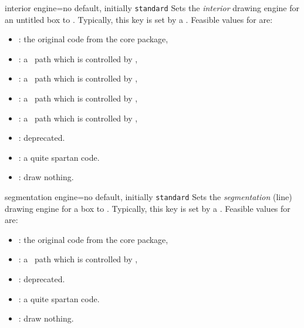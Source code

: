 \clearpage
\begin{docTcbKey}{interior engine}{=}{no default, initially \texttt{standard}}
  Sets the \emph{interior} drawing engine for an untitled box to .
  Typically, this key is set by a .
  Feasible values for  are:
  \begin{itemize}
  \item{}: the original code from the core package,
  \item{}: a \tikzname\ path which is controlled by ,
  \item{}: a \tikzname\ path which is controlled by ,
  \item{}: a \tikzname\ path which is controlled by ,
  \item{}: a \tikzname\ path which is controlled by ,
  \item{}: deprecated.
  \item{}: a quite spartan code.
  \item{}: draw nothing.
  \end{itemize}
\end{docTcbKey}

\begin{docTcbKey}{segmentation engine}{=}{no default, initially \texttt{standard}}
  Sets the \emph{segmentation} (line) drawing engine for a box to .
  Typically, this key is set by a .
  Feasible values for  are:
  \begin{itemize}
  \item{}: the original code from the core package,
  \item{}: a \tikzname\ path which is controlled by ,
  \item{}: deprecated.
  \item{}: a quite spartan code.
  \item{}: draw nothing.
  \end{itemize}
\end{docTcbKey}

